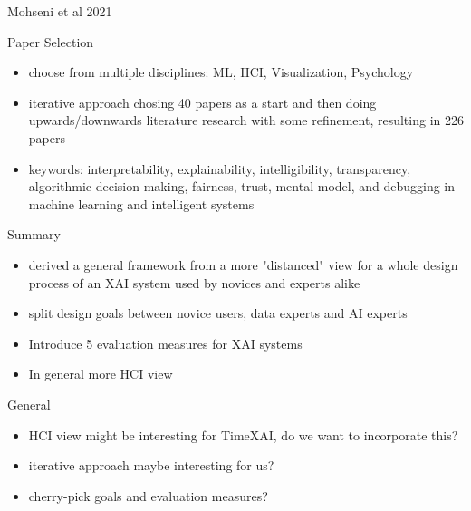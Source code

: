 \documentclass[presentation]{beamer}
\begin{document}
\begin{frame}[label={sec:org1393c3e}]{Mohseni et al 2021}
\begin{block}{Paper Selection}
\begin{itemize}
\item choose from multiple disciplines: ML, HCI, Visualization, Psychology
\item iterative approach chosing 40 papers as a start and then doing upwards/downwards literature research with some refinement, resulting in 226 papers
\item keywords: interpretability, explainability, intelligibility, transparency, algorithmic decision-making, fairness, trust, mental model, and debugging in machine learning and intelligent systems
\end{itemize}
\end{block}
\end{frame}
\begin{frame}
\begin{block}{Summary}
\begin{itemize}
\item derived a general framework from a more "distanced" view for a whole design process of an XAI system used by novices and experts alike
\item split design goals between novice users, data experts and AI experts
\item Introduce 5 evaluation measures for XAI systems
\item In general more HCI view
\end{itemize}
\end{block}
\end{frame}
\begin{frame}
\begin{block}{General}
\begin{itemize}
\item HCI view might be interesting for TimeXAI, do we want to incorporate this?
\item iterative approach maybe interesting for us?
\item cherry-pick goals and evaluation measures?
\end{itemize}
\end{block}
\end{frame}
\end{document}
